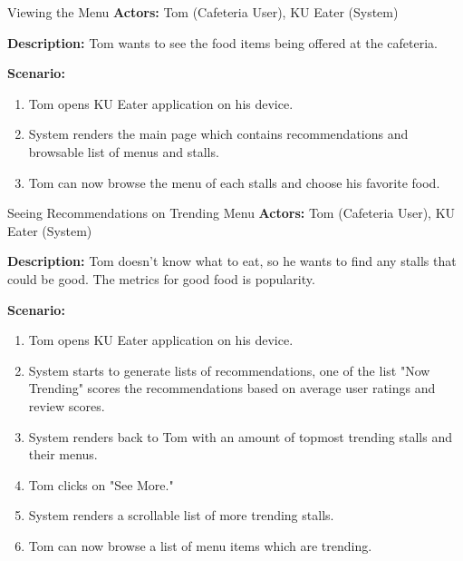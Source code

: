 
\begin{usecase}{Viewing the Menu}
    \textbf{Actors:} Tom (Cafeteria User), KU Eater (System)
    
    \textbf{Description:} Tom wants to see the food items being offered at the cafeteria.

    \textbf{Scenario:}

    \begin{enumerate}[leftmargin=80pt]
        \item Tom opens KU Eater application on his device.
        \item System renders the main page which contains recommendations and browsable list of menus and stalls.
        \item Tom can now browse the menu of each stalls and choose his favorite food.
    \end{enumerate}
\end{usecase}

\begin{usecase}{Seeing Recommendations on Trending Menu}
    \textbf{Actors:} Tom (Cafeteria User), KU Eater (System)
    
    \textbf{Description:} Tom doesn't know what to eat, so he wants to find any stalls that could be good. The metrics
    for good food is popularity.

    \textbf{Scenario:}

    \begin{enumerate}[leftmargin=80pt]
        \item Tom opens KU Eater application on his device.
        \item System starts to generate lists of recommendations, one of the list "Now Trending" scores the recommendations
        based on average user ratings and review scores.
        \item System renders back to Tom with an amount of topmost trending stalls and their menus.
        \item Tom clicks on "See More."
        \item System renders a scrollable list of more trending stalls.
        \item Tom can now browse a list of menu items which are trending.
    \end{enumerate}
\end{usecase}

